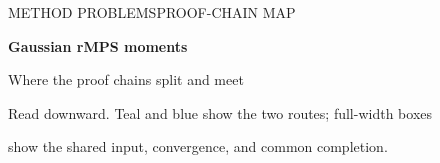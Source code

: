 \documentclass[11pt]{article}
\numberwithin{equation}{section}
\theoremstyle{definition}\newtheorem{definition}[theorem]{Definition}
\theoremstyle{remark}\newtheorem{remark}[theorem]{Remark}
\begin{document}
\thispagestyle{empty}
{\sffamily\color{Navy}\small METHOD PROBLEMS\hfill PROOF-CHAIN MAP\par}
\vspace{3mm}
{\sffamily\bfseries\fontsize{24}{28}\selectfont Gaussian rMPS moments\par}
\vspace{1.5mm}
{\sffamily\large Where the proof chains split and meet\par}
\vspace{2mm}
{\small Read downward. Teal and blue show the two routes; full-width boxes\par
show the shared input, convergence, and common completion.\par}
\vspace{2mm}

\newlength{\RMPSFullWidth}
\setlength{\RMPSFullWidth}{\dimexpr\textwidth-16pt\relax}
\newlength{\RMPSColumnWidth}
\setlength{\RMPSColumnWidth}{.5\textwidth}
\addtolength{\RMPSColumnWidth}{-5mm}
\addtolength{\RMPSColumnWidth}{-14pt}
\newlength{\RMPSColumnOffset}
\setlength{\RMPSColumnOffset}{.25\textwidth}
\addtolength{\RMPSColumnOffset}{2.5mm}
\end{document}
